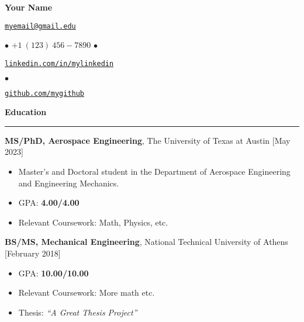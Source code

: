\documentclass[10pt,letterpaper,hidelinks]{article}
\begin{document}

\begin{center}
\large{\textbf{Your Name}}\\
\vspace{0.1cm}

\begin{small}
\begin{small}
\texttt{\href{mailto:myemail@gmail.edu}{myemail@gmail.edu}}
\end{small}
\footnotesize{ $\bullet$ }
$+1 ~ (123)~456{-}7890$
\footnotesize{ $\bullet$ }
\begin{small}
\texttt{\href{https://www.linkedin.com/in/mylinkedin}{linkedin.com/in/mylinkedin}}
\end{small}
\footnotesize{ $\bullet$ }
\begin{small}
\texttt{\href{https://github.com/mygithub}{github.com/mygithub}}
\end{small}
\end{small}
\end{center}



\vspace{0.1cm}
\begin{flushleft}
\large{\textbf{Education}}
\vspace{0.1cm}
\hrule
\end{flushleft}

\textbf{MS/PhD, Aerospace Engineering}, The University of Texas at Austin \hfill [May 2023]
\vspace{-0.1cm}
\begin{itemize}
	\setlength\itemsep{-0.1cm}
    \item Master's and Doctoral student in the Department of Aerospace Engineering and Engineering Mechanics.
    \item GPA: \textbf{4.00/4.00}
	\item Relevant Coursework: Math, Physics, etc.
\end{itemize}

\textbf{BS/MS, Mechanical Engineering}, National Technical University of Athens \hfill [February 2018]
\vspace{-0.1cm}
\begin{itemize}
	\setlength\itemsep{-0.1cm}
    \item GPA: \textbf{10.00/10.00}
	\item Relevant Coursework: More math etc.
	\item Thesis: \textit{``A Great Thesis Project''}
\end{itemize}
\end{document}
